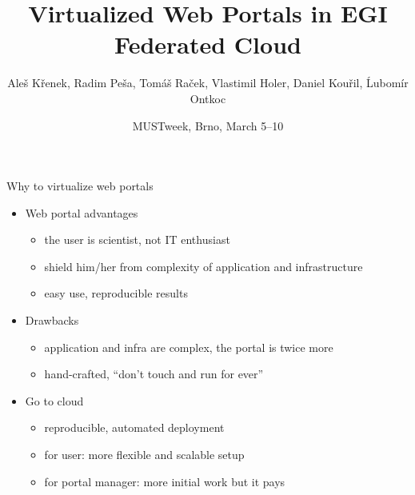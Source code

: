 \documentclass[smaller,t]{beamer}
\begin{document}
\makeatletter

\title{Virtualized Web Portals in EGI \\[\smallskipamount] Federated Cloud}
\date{MUSTweek, Brno, March 5--10}
\author[A. Křenek et al.]{Aleš Křenek, Radim Peša, Tomáš Raček, Vlastimil Holer, Daniel Kouřil, Ĺubomír Ontkoc}
\begin{frame}
\maketitle
\end{frame}

\begin{frame}{Why to virtualize web portals}
\begin{itemize}

\item{Web portal advantages}
\begin{itemize}
\item the user is scientist, not IT enthusiast
\item shield him/her from complexity of application and infrastructure
\item easy use, reproducible results
\end{itemize}

\item{Drawbacks}
\begin{itemize}
\item application and infra are complex, the portal is twice more
\item hand-crafted, ``don't touch and run for ever''
\end{itemize}

\item{Go to cloud}
\begin{itemize}
\item reproducible, automated deployment
\item for user: more flexible and scalable setup
\item for portal manager: more initial work but it pays
\end{itemize}
\end{itemize}

\end{frame}
\end{document}
